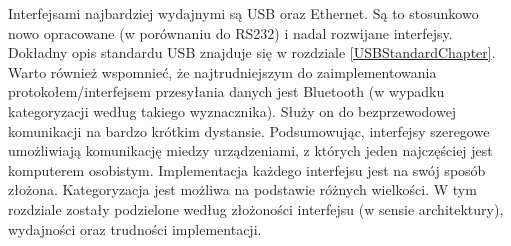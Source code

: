 \documentclass{BscUS}
\begin{document}
\indent Interfejsami najbardziej wydajnymi są USB oraz Ethernet. Są to stosunkowo nowo opracowane (w porównaniu do RS232) i nadal rozwijane interfejsy. Dokładny opis standardu USB znajduje się w rozdziale \ref{USBStandardChapter}.
Warto również wspomnieć, że najtrudniejszym do zaimplementowania protokołem/interfejsem przesyłania danych jest Bluetooth (w wypadku kategoryzacji według takiego wyznacznika). Służy on do bezprzewodowej komunikacji na bardzo krótkim dystansie.
\newline
\indent Podsumowując, interfejsy szeregowe umożliwiają komunikację miedzy urządzeniami, z których jeden najczęściej jest komputerem osobistym. Implementacja każdego interfejsu jest na swój sposób złożona. Kategoryzacja jest możliwa na podstawie różnych wielkości. W tym rozdziale zostały podzielone według złożoności interfejsu (w sensie architektury), wydajności oraz trudności implementacji.
\end{document}
